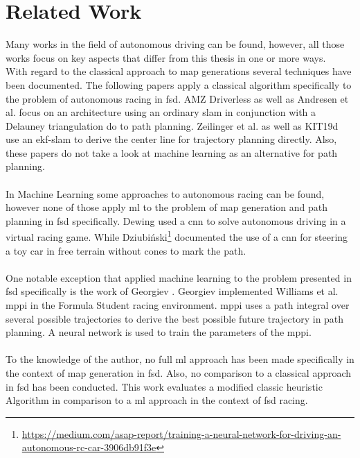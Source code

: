 \section{Related Work}
Many works in the field of autonomous driving can be found, however, all those works focus on key aspects that differ from this thesis in one or more ways. \\
With regard to the classical approach to map generations several techniques have been documented. The following papers apply a classical algorithm specifically to the problem of autonomous racing in \ac{fsd}. AMZ Driverless \cite{kabzan2019amz} as well as Andresen et al. \cite{andresen2020} focus on an architecture using an ordinary \ac{slam} in conjunction with a Delauney triangulation do to path planning. Zeilinger et al. \cite{zeilinger2017} as well as KIT19d \cite{nekkah2020} use an \ac{ekf}-\ac{slam} to derive the center line for trajectory planning directly. Also, these papers do not take a look at machine learning as an alternative for path planning.\\
\\
In Machine Learning some approaches to autonomous racing can be found, however none of those apply \ac{ml} to the problem of map generation and path planning in \ac{fsd} specifically. Dewing \cite{DewingNowTI}
used a \ac{cnn} to solve autonomous driving in a virtual racing game. While Dziubiński\footnote{\url{https://medium.com/asap-report/training-a-neural-network-for-driving-an-autonomous-rc-car-3906db91f3e}} documented the use of a \ac{cnn} for steering a toy car in free terrain without cones to mark the path.\\
\\
One notable exception that applied machine learning to the problem presented in \ac{fsd} specifically is the work of Georgiev \cite{georgiev2019}. Georgiev implemented Williams et al. \cite{williams2016} \ac{mppi} in the Formula Student racing environment. \ac{mppi} uses a path integral over several possible trajectories to derive the best possible future trajectory in path planning. A neural network is used to train the parameters of the \ac{mppi}.\\
\\
To the knowledge of the author, no full \ac{ml} approach has been made specifically in the context of map generation in \ac{fsd}. Also, no comparison to a classical approach in \ac{fsd} has been conducted. This work evaluates a modified classic heuristic Algorithm in comparison to a \ac{ml} approach in the context of \ac{fsd} racing.

